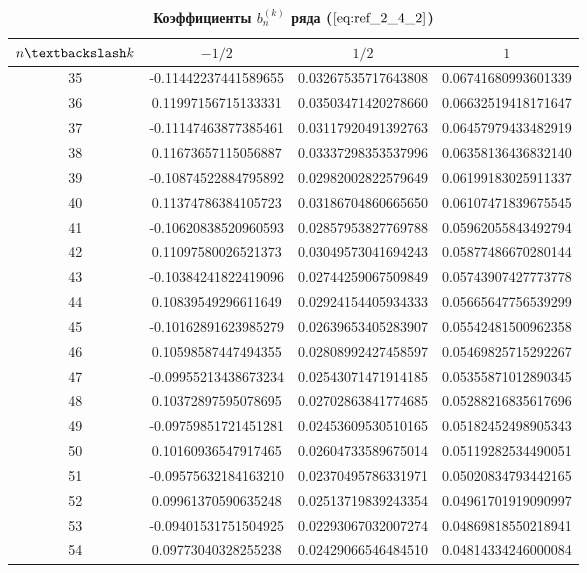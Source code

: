 \begin{table}[]
\caption{\textbf{Коэффициенты $b_n^{(k)}$ ряда ($\ref{eq:ref_2_4_2}$)}}
\begin{center}
\begin{tabular}{|c|c|c|c|}
\hline
$n \textbackslash k$ & $-1/2$ & $1/2$ & $1$ \\
\hline
35 & -0.11442237441589655 & 0.03267535717643808 & 0.06741680993601339 \\
36 &  0.11997156715133331 & 0.03503471420278660 & 0.06632519418171647 \\
37 & -0.11147463877385461 & 0.03117920491392763 & 0.06457979433482919 \\
38 &  0.11673657115056887 & 0.03337298353537996 & 0.06358136436832140 \\
39 & -0.10874522884795892 & 0.02982002822579649 & 0.06199183025911337 \\
40 &  0.11374786384105723 & 0.03186704860665650 & 0.06107471839675545 \\
41 & -0.10620838520960593 & 0.02857953827769788 & 0.05962055843492794 \\
42 &  0.11097580026521373 & 0.03049573041694243 & 0.05877486670280144 \\
43 & -0.10384241822419096 & 0.02744259067509849 & 0.05743907427773778 \\
44 &  0.10839549296611649 & 0.02924154405934333 & 0.05665647756539299 \\
45 & -0.10162891623985279 & 0.02639653405283907 & 0.05542481500962358 \\
46 &  0.10598587447494355 & 0.02808992427458597 & 0.05469825715292267 \\
47 & -0.09955213438673234 & 0.02543071471914185 & 0.05355871012890345 \\
48 &  0.10372897595078695 & 0.02702863841774685 & 0.05288216835617696 \\
49 & -0.09759851721451281 & 0.02453609530510165 & 0.05182452498905343 \\
50 &  0.10160936547917465 & 0.02604733589675014 & 0.05119282534490051 \\
51 & -0.09575632184163210 & 0.02370495786331971 & 0.05020834793442165 \\
52 &  0.09961370590635248 & 0.02513719839243354 & 0.04961701919090997 \\
53 & -0.09401531751504925 & 0.02293067032007274 & 0.04869818550218941 \\
54 &  0.09773040328255238 & 0.02429066546484510 & 0.04814334246000084 \\

\end{tabular}
\end{center}
\end{table}
